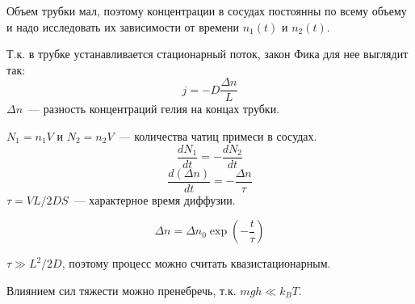 Объем трубки мал, поэтому концентрации в сосудах постоянны по всему объему и надо
исследовать их зависимости от времени $n_1(t)$ и $n_2(t)$.

Т.к. в трубке устанавливается стационарный поток, закон Фика для нее выглядит так:
\[j=-D\frac{\Delta n}{L}\]
$\Delta n$~--- разность концентраций гелия на концах трубки.

$N_1 = n_1V$ и $N_2=n_2V$~--- количества чатиц примеси в сосудах.
\[\frac{dN_1}{dt}=-\frac{dN_2}{dt}\]
\[\frac{d(\Delta n)}{dt}=-\frac{\Delta n}{\tau}\]
$\tau=VL/2DS$~--- характерное время диффузии.

\[\Delta n = \Delta n_0\exp\left(-\frac{t}{\tau}\right)\]

$\tau\gg L^2/2D$, поэтому процесс можно считать квазистационарным.

Влиянием сил тяжести можно пренебречь, т.к. $mgh\ll k_BT$.


